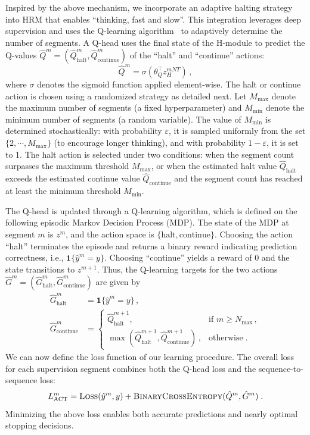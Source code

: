 Inspired by the above mechanism, we incorporate an adaptive halting strategy into HRM that enables ``thinking, fast and slow''. This integration leverages deep supervision and uses the Q-learning algorithm~\cite{Sutton-Barto-2018} to adaptively determine the number of segments. A Q-head uses the final state of the H-module to predict the Q-values $\hat{Q}^m = (\hat{Q}^m_\text{halt}, \hat{Q}^m_\text{continue})$ of the ``halt'' and ``continue'' actions:
\begin{equation*}
    \hat{Q}^m = \sigma(\theta_Q^\top z_H^{mNT})\,,
\end{equation*}
where $\sigma$ denotes the sigmoid function applied element-wise. The halt or continue action is chosen using a randomized strategy as detailed next. Let $M_{\max}$ denote the maximum number of segments (a fixed hyperparameter) and $M_{\min}$ denote the minimum number of segments (a random variable). The value of $M_{\min}$ is determined stochastically: with probability $\varepsilon$, it is sampled uniformly from the set $\{2,\cdots,M_{\max}\}$ (to encourage longer thinking), and with probability $1-\varepsilon$, it is set to 1. The halt action is selected under two conditions: when the segment count surpasses the maximum threshold $M_{\max}$, or when the estimated halt value $\hat{Q}_\text{halt}$ exceeds the estimated continue value $\hat{Q}_\text{continue}$ and the segment count has reached at least the minimum threshold $M_{\min}$.

The Q-head is updated through a Q-learning algorithm, which is defined on the following episodic Markov Decision Process (MDP). The state of the MDP at segment $m$ is $z^m$, and the action space is $\{\text{halt}, \text{continue}\}$. Choosing the action ``halt'' terminates the episode and returns a binary reward indicating prediction correctness, i.e., $\mathbf{1}\{\hat{y}^m = y\}$. Choosing ``continue'' yields a reward of 0 and the state transitions to $z^{m+1}$. Thus, the Q-learning targets for the two actions $\hat{G}^m = (\hat{G}^m_\text{halt}, \hat{G}^m_\text{continue})$ are given by
\begin{align*}
\hat{G}_\text{halt}^m &= \mathbf{1}\{\hat{y}^m = y\}\,, \\
\hat{G}_\text{continue}^m &= 
\begin{cases}
\hat{Q}_\text{halt}^{m+1}, & \text{if $m \geq N_{\max}$}\,,\\[6pt]
\max(\hat{Q}_\text{halt}^{m+1}, \hat{Q}_\text{continue}^{m+1})\,, & \text{otherwise}\;.
\end{cases}
\end{align*}
We can now define the loss function of our learning procedure. The overall loss for each supervision segment combines both the Q-head loss and the sequence-to-sequence loss:
\begin{equation*}
    L^m_\text{ACT} = \textsc{Loss}(\hat{y}^m, y) + \textsc{BinaryCrossEntropy}(\hat{Q}^m, \hat{G}^m) \;.
\end{equation*}
Minimizing the above loss enables both accurate predictions and nearly optimal stopping decisions. 

